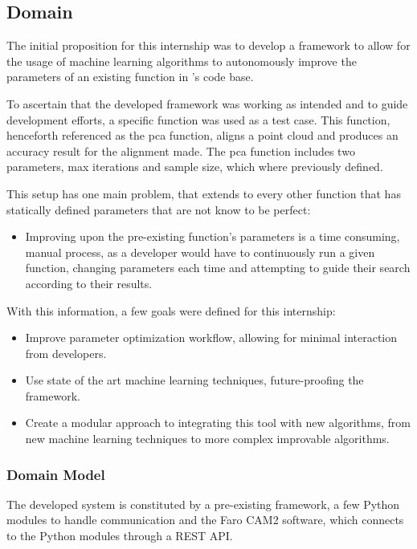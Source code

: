 
\subsection{Domain}

The initial proposition for this internship was to develop a framework to allow for the usage of machine learning algorithms to autonomously improve the parameters of an existing function in \faro's code base.

To ascertain that the developed framework was working as intended and to guide development efforts, a specific function was used as a test case. This function, henceforth referenced as the \acrfull{pca} function, aligns a point cloud and produces an accuracy result for the alignment made. The \acrshort{pca} function includes two parameters, max iterations and sample size, which where previously defined.

This setup has one main problem, that extends to every other function that has statically defined parameters that are not know to be perfect:

\begin{itemize}
	\item Improving upon the pre-existing function's parameters is a time consuming, manual process, as a developer would have to continuously run a given function, changing parameters each time and attempting to guide their search according to their results.
\end{itemize}

With this information, a few goals were defined for this internship:

\begin{itemize}
	\item Improve parameter optimization workflow, allowing for minimal interaction from developers.
	\item Use state of the art machine learning techniques, future-proofing the framework.
	\item Create a modular approach to integrating this tool with new algorithms, from new machine learning techniques to more complex improvable algorithms.
\end{itemize}

\subsubsection{Domain Model}

The developed system is constituted by a pre-existing framework, a few Python modules to handle communication and the Faro CAM2 software, which connects to the Python modules through a REST API.

